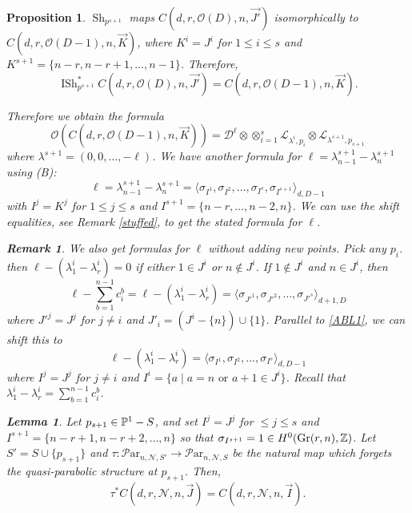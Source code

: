 \documentclass[11pt]{amsart}
\newcommand\tensor{\otimes}
\newcommand\ml{\mathcal{L}}
\newcommand\mn{\mathcal{N}}
\newcommand\Par{\mathcal{P}\text{ar} }
\newcommand\Gr{\operatorname{Gr}}
\newtheorem{remark}[theorem]{ Remark}
\newtheorem{proposition}[theorem]{Proposition}
\newtheorem{lemma}[theorem]{Lemma}
\numberwithin{theorem}{subsection}
\begin{document}
{\begin{proposition}
 $\operatorname{Sh}_{p^{s+1}}$ maps $C(d,r,\mathcal{O}(D),n,\vec{J'})$ isomorphically to $C(d,r,\mathcal{O}(D-1),n,\vec{K})$,
where $K^i=J^i$ for $1\leq i \leq s$ and $K^{s+1}=\{n-r,n-r+1,\dots,n-1\}$. Therefore,
$$\operatorname{ISh}_{p^{s+1}}^*C(d,r,\mathcal{O}(D),n,\vec{J'})=C(d,r,\mathcal{O}(D-1),n,\vec{K}).$$

Therefore we obtain the formula
$$\mathcal{O}(C(d,r,\mathcal{O}(D-1),n,\vec{K}))= \mathcal{D}^{\ell}\tensor\tensor_{i=1}^s\ml_{\lambda^i,p_i}\tensor\ml_{\lambda^{s+1},p_{s+1}}$$
where $\lambda^{s+1}=(0,0,\dots,-\ell)$. We have another formula for $\ell= \lambda_{n-1}^{s+1}-\lambda_{n}^{s+1}$ using  (B):
\begin{equation}\label{ABL1}
\ell= \lambda_{n-1}^{s+1}-\lambda_{n}^{s+1}=\langle\sigma_{I^1}, \sigma_{I^2},\dots,\sigma_{I^s},\sigma_{I^{s+1}}\rangle_{d,D-1}
\end{equation}
with $I^j=K^j$ for $1\leq j\leq s$ and $I^{s+1}=\{n-r,\dots,n-2,n\}$. We can use the shift equalities, see Remark \ref{stuffed},  to get the stated formula for $\ell$.

\begin{remark}\label{earlyAM}
We also get formulas for $\ell$ without adding new points.  Pick any $p_i$. then $\ell-(\lambda^i_{1}-\lambda^i_{r})=0$ if either $1\in J^i$ or $n\not\in J^i$. If $1\not\in J^i$ and $n\in J^i$, then
\begin{equation}\label{ABL4}
\ell-\sum_{b=1}^{n-1}c^b_i=\ell-(\lambda^i_{1}-\lambda^i_{r})=\langle\sigma_{J'^1}, \sigma_{J'^2},\dots,\sigma_{J'^s}\rangle_{d+1,D}
\end{equation}
where $J'^j=J^j$ for $j\neq i$ and $J'_i= (J^{i}-\{n\})\cup \{1\}$. Parallel to \eqref{ABL1}, we can shift this to
$$\ell-(\lambda^i_{1}-\lambda^i_{r})=\langle\sigma_{I^1}, \sigma_{I^2},\dots,\sigma_{I^s}\rangle_{d,D-1}$$
where $I^j=J^j$ for $j\neq i$ and $I^i= \{a\mid a=n\text{ or } a+1\in J^i\}$. Recall that $\lambda^i_1-\lambda^i_r=\sum_{b=1}^{n-1} c^b_i$.
\end{remark}

\begin{lemma}\label{propagation}
 Let $p_{s+1}\in \Bbb{P}^1-S$, and set $I^j=J^j$ for $\leq j\leq s$ and  $I^{s+1}=\{n-r+1,n-r+2,\dots,n\}$ so that $\sigma_{I^{s+1}}=1\in H^0(\Gr(r,n),\Bbb{Z})$. Let $S'=S\cup\{p_{s+1}\}$ and $\tau: \Par_{n,\mn,S'}\to \Par_{n,\mn,S}$ be the natural map which forgets the quasi-parabolic structure at $p_{s+1}$. Then,
 $$\tau^*C(d,r,\mn,n,\vec{J})=C(d,r,\mn,n,\vec{I}).$$
 \end{lemma}

\end{proposition}}
\end{document}
